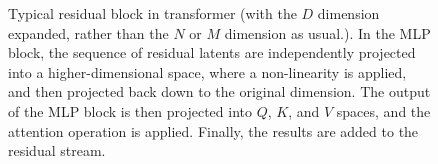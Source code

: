 \begin{figure}
    \caption[Typical residual block in transformer]{Typical residual block in transformer (with the $D$ dimension expanded, rather than the $N$ or $M$ dimension as usual.). In the MLP block, the sequence of residual latents are independently projected into a higher-dimensional space, where a non-linearity is applied, and then projected back down to the original dimension. The output of the MLP block is then projected into $Q$, $K$, and $V$ spaces, and the attention operation is applied. Finally, the results are added to the residual stream.}
    \label{fig:residual-block}
\end{figure}
